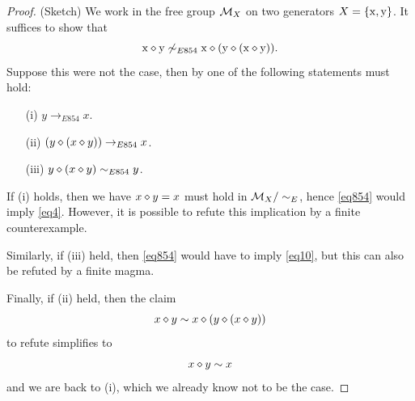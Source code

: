 \begin{proof}(Sketch)
  We work in the free group ${\mathcal{M}}_X$ on two generators $X = \{\mathrm{x},\mathrm{y}\}$.  It suffices to show that
$$  \mathrm{x} \diamond \mathrm{y} \not \sim_{E854} \mathrm{x} \diamond (\mathrm{y} \diamond (\mathrm{x} \diamond \mathrm{y})).$$
Suppose this were not the case, then by  one of the following statements must hold:
\begin{itemize}
\item[(i)] $y \to_{E854} x$.
\item[(ii)] $(y \diamond (x \diamond y)) \to_{E854} x$.
\item[(iii)] $y \diamond (x \diamond y) \sim_{E854} y$.
\end{itemize}
If (i) holds, then we have $x \diamond y = x$ must hold in ${\mathcal{M}}_X/\sim_E$, hence \eqref{eq854} would imply \eqref{eq4}.  However, it is possible to refute this implication by a finite counterexample.

Similarly, if (iii) held, then \eqref{eq854} would have to imply \eqref{eq10}, but this can also be refuted by a finite magma.

Finally, if (ii) held, then the claim
$$  x \diamond y \sim x \diamond (y \diamond (x \diamond y))$$
to refute simplifies to
$$  x \diamond y \sim x$$
and we are back to (i), which we already know not to be the case.
\end{proof}
